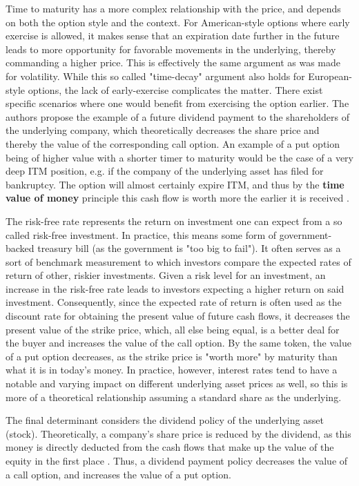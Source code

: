 \documentclass[english,12pt,a4paper,pdftex,sci,utf8]{aaltothesis}
\begin{document}
Time to maturity has a more complex relationship with the price, and depends on both the option style and the context. For American-style options where early exercise is allowed, it makes sense that an expiration date further in the future leads to more opportunity for favorable movements in the underlying, thereby commanding a higher price. This is effectively the same argument as was made for  volatility. While this so called "time-decay" argument also holds for European-style options, the lack of early-exercise complicates the matter. There exist specific scenarios where one would benefit from exercising the option earlier. The authors propose the example of a future dividend payment to the shareholders of the underlying company, which theoretically decreases the share price and thereby the value of the corresponding call option. An example of a put option being of higher value with a shorter timer to maturity would be the case of a very deep ITM position, e.g. if the company of the underlying asset has filed for bankruptcy. The option will almost certainly expire ITM, and thus by the \textbf{time value of money} principle this cash flow is worth more the earlier it is received \cite[pp. 97-101]{berk2007corporate}.


The risk-free rate represents the return on investment one can expect from a so called risk-free investment. In practice, this means some form of government-backed treasury bill (as the government is "too big to fail"). It often serves as a sort of benchmark measurement to which investors compare the expected rates of return of other, riskier investments. Given a risk level for an investment, an increase in the risk-free rate leads to investors expecting a higher return on said investment. Consequently, since the expected rate of return is often used as the discount rate for obtaining the present value of future cash flows, it decreases the present value of the strike price, which, all else being equal, is a better deal for the buyer and increases the value of the call option. By the same token, the value of a put option decreases, as the strike price is "worth more" by maturity than what it is in today's money. In practice, however, interest rates tend to have a notable and varying impact on different underlying asset prices as well, so this is more of a theoretical relationship assuming a standard share as the underlying.

The final determinant considers the dividend policy of the underlying asset (stock). Theoretically, a company's share price is reduced by the dividend, as this money is directly deducted from the cash flows that make up the value of the equity in the first place \cite{modigliani1958cost}. Thus, a dividend payment policy decreases the value of a call option, and increases the value of a put option.
\end{document}
